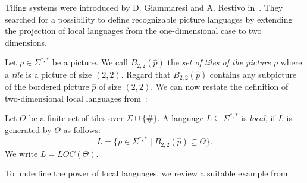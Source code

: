 Tiling systems were introduced by D. Giammaresi and A. Restivo
in~\cite{giammarresi1992recognizable}. They searched for a possibility to define recognizable
picture languages by extending the projection of local languages from the one-dimensional case to
two dimensions.

Let $p \in \Sigma^{*, *}$ be a picture. We call $B_{2, 2}(\hat{p})$ the \emph{set of tiles of the
picture $p$} where a \emph{tile} is a picture of size $(2, 2)$. Regard that $B_{2, 2}(\hat{p})$
contains any subpicture of the bordered picture $\hat{p}$ of size $(2, 2)$. We can now restate the
definition of two-dimensional local languages from~\cite{cherubini2009picture}:
\begin{definition}
	Let $\Theta$ be a finite set of tiles over $\Sigma \cup \{\#\}$. A language $L \subseteq \Sigma^{*,
	*}$ is \emph{local}, if $L$ is generated by $\Theta$ as follows: 
	\[L = \{p \in \Sigma^{*, *} \mid B_{2, 2}(\hat{p}) \subseteq \Theta\}.\]
	We write $L = LOC(\Theta)$.
\end{definition}
To underline the power of local languages, we review a suitable example
from~\cite{giammarresi1997twodimensional}.
